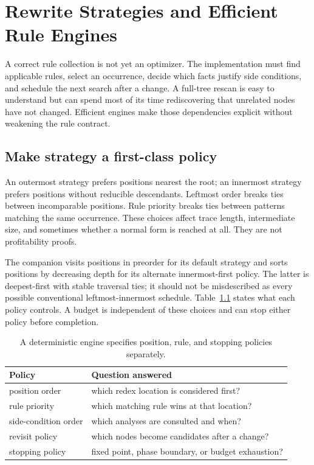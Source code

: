 \chapter{Rewrite Strategies and Efficient Rule Engines}
\label{ch:rewrite-strategies}

A correct rule collection is not yet an optimizer.
The implementation must find applicable rules, select an occurrence, decide which facts justify side conditions, and schedule the next search after a change.
A full-tree rescan is easy to understand but can spend most of its time rediscovering that unrelated nodes have not changed.
Efficient engines make those dependencies explicit without weakening the rule contract.

\section{Make strategy a first-class policy}
\label{sec:ch85-strategy}
An outermost strategy prefers positions nearest the root; an innermost strategy prefers positions without reducible descendants.
Leftmost order breaks ties between incomparable positions.
Rule priority breaks ties between patterns matching the same occurrence.
These choices affect trace length, intermediate size, and sometimes whether a normal form is reached at all.
They are not profitability proofs.

The companion visits positions in preorder for its default strategy and sorts positions by decreasing depth for its alternate innermost-first policy.
The latter is deepest-first with stable traversal ties; it should not be misdescribed as every possible conventional leftmost-innermost schedule.
Table~\ref{tab:ch85-strategies} states what each policy controls.
A budget is independent of these choices and can stop either policy before completion.

\begin{table}[htbp]
\caption{A deterministic engine specifies position, rule, and stopping policies separately.}
\label{tab:ch85-strategies}
\centering
\begin{tabular}{ll}
\toprule
Policy & Question answered \\
\midrule
position order & which redex location is considered first? \\
rule priority & which matching rule wins at that location? \\
side-condition order & which analyses are consulted and when? \\
revisit policy & which nodes become candidates after a change? \\
stopping policy & fixed point, phase boundary, or budget exhaustion? \\
\bottomrule
\end{tabular}
\end{table}

